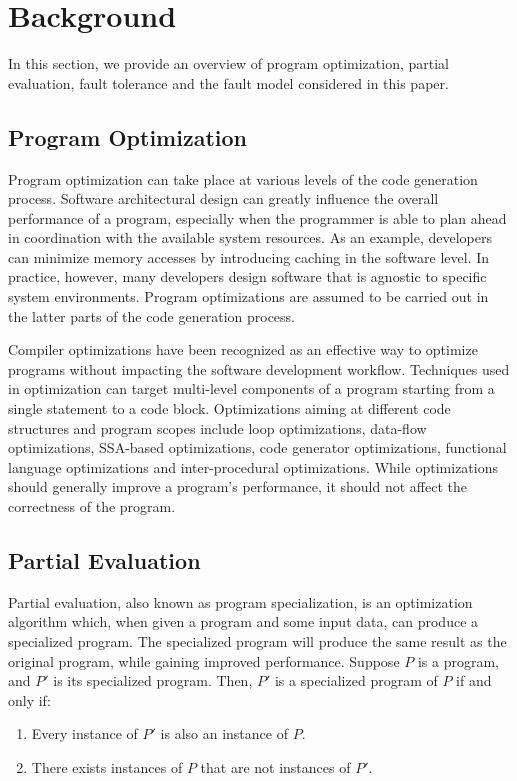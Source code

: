 \section{Background}
\label{sec:background}

In this section, we provide an overview of program optimization, partial evaluation, fault tolerance and the fault model considered in this paper.

\subsection{Program Optimization}
Program optimization can take place at various levels of the code generation process.
Software architectural design can greatly influence the overall performance of a program, especially when the programmer is able to plan ahead in coordination with the available system resources.
As an example, developers can minimize memory accesses by introducing caching in the software level.
In practice, however, many developers design software that is agnostic to specific system environments.
Program optimizations are assumed to be carried out in the latter parts of the code generation process. 

Compiler optimizations have been recognized as an effective way to optimize programs without impacting the software development workflow.
Techniques used in optimization can target multi-level components of a program starting from a single statement to a code block. 
Optimizations aiming at different code structures and program scopes include loop optimizations, data-flow optimizations, SSA-based optimizations, code generator optimizations, functional language optimizations and inter-procedural optimizations. While optimizations should generally improve a program's performance, it should not affect the correctness of the program.

\subsection{Partial Evaluation}
Partial evaluation, also known as program specialization, is an optimization algorithm which, when given a program and some input data, can produce a specialized program. The specialized program will produce the same result as the original program, while gaining improved performance. Suppose $P$ is a program, and $P'$ is its specialized program. Then, $P'$ is a specialized program of $P$ if and only if:
\begin{enumerate}
\item Every instance of $P'$ is also an instance of $P$.
\item There exists instances of $P$ that are not instances of $P'$.
\end{enumerate}

